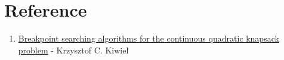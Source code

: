 \documentclass[12pt]{article}
\begin{document}
    \pagebreak
    \section{Reference}
    \begin{enumerate}
        \item
            \href{https://link.springer.com/article/10.1007/s10107-006-0050-z}
                {Breakpoint searching algorithms for the continuous quadratic knapsack problem} - Krzysztof C. Kiwiel \label{p:1}
    \end{enumerate}
\end{document}
